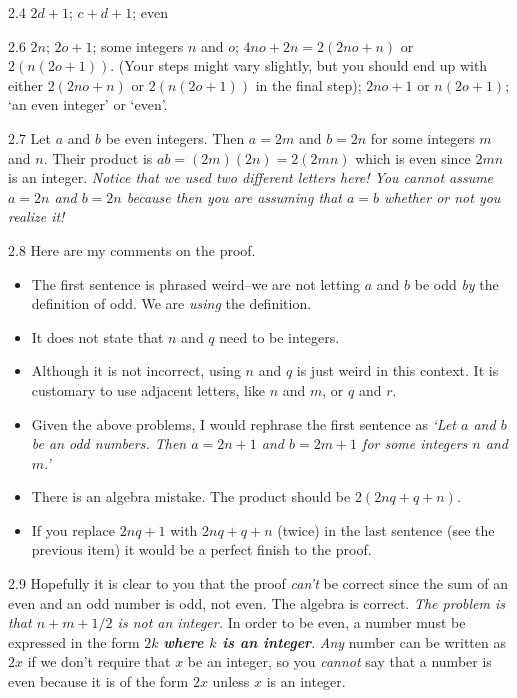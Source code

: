 \begin{Answer}{2.4}
$2d+1$;
$c+d+1$;
even
\end{Answer}
\begin{Answer}{2.6}
$2n$;
$2o+1$;
some integers $n$ and $o$;
$4no+2n=2(2no+n)$ or $2(n(2o+1))$.  (Your steps might vary slightly, but you should end up with
either $2(2no+n)$ or  $2(n(2o+1))$ in the final step);
$2no + 1$  or $n(2o+1)$;
`an even integer' or `even'.

\end{Answer}
\begin{Answer}{2.7}
Let $a$ and $b$ be even integers.  Then $a=2m$ and $b=2n$ for some integers $m$ and $n$.
Their product is $ab=(2m)(2n)=2(2mn)$ which is even since $2mn$ is an integer. {\em Notice that we used two different letters here!
You cannot assume $a=2n$ and $b=2n$  because then you are
assuming that $a=b$ whether or not you realize it!}
\end{Answer}
\begin{Answer}{2.8}
Here are my comments on the proof.
\begin{itemize}
\item
The first sentence is phrased weird--we are not letting $a$ and $b$ be odd {\em by} the definition of odd.
We are {\em using} the definition.
\item
It does not state that $n$ and $q$ need to be integers.
\item
Although it is not incorrect, using $n$ and $q$ is just weird in this context.
It is customary to use adjacent letters, like $n$ and $m$, or $q$ and $r$.
\item
Given the above problems, I would rephrase the first sentence as
{\em `Let $a$ and $b$ be an odd numbers.
Then $a=2n+1$ and $b=2m+1$ for some integers $n$ and $m$.'}
\item
There is an algebra mistake.  The product should be $2(2nq+q+n)$.
\item
If you replace $2nq+1$ with $2nq+q+n$ (twice) in the last sentence (see the previous item)
it would be a perfect finish to the proof.
\end{itemize}
\end{Answer}
\begin{Answer}{2.9}
Hopefully it is clear to you that the proof {\em can't} be correct since the sum of an even and an odd number is odd, not even.
The algebra is correct.
{\em The problem is that $n+m+1/2$ is not an integer.}
In order to be even, a number must be expressed
in the form $2k$ {\bf\em where $k$ is an integer}.  {\em Any} number can be written as $2x$ if we don't require that $x$ be an integer,
so you {\em cannot} say that a number is even because it is of the form $2x$ unless $x$ is an integer.
\end{Answer}
